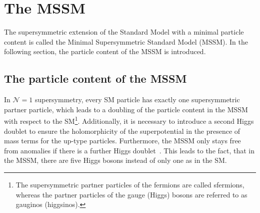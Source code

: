 \section{The MSSM}
\label{sec:MSSM}
The supersymmetric extension of the Standard Model with a minimal particle content is called the Minimal Supersymmetric Standard Model (MSSM).
In the following section, the particle content of the MSSM is introduced.

\subsection{The particle content of the MSSM}
In $\mathcal{N}=1$ supersymmetry, every SM particle has exactly one supersymmetric partner particle, which leads to a doubling of the particle content in the MSSM with respect to the SM\footnote{The supersymmetric partner particles of the fermions are called sfermions, whereas the partner particles of the gauge (Higgs) bosons are referred to as gauginos (higgsinos).}.
Additionally, it is necessary to introduce a second Higgs doublet to ensure the holomorphicity of the superpotential in the presence of mass terms for the up-type particles.
Furthermore, the MSSM only stays free from anomalies if there is a further Higgs doublet~\cite{bib:SUSYPrimer}.
This leads to the fact, that in the MSSM, there are five Higgs bosons instead of only one as in the SM.


